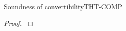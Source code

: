 \documentclass[acmlarge, anonymous, authordraft, review]{acmart} %
\begin{document}
\begin{lemma}{Soundness of convertibility}{THT-COMP}
  \begin{conds}
    \cond{$\Convertible\K\t\tp$}
    \cond{$\EnvTypeW\Env\K\e\t$}
    \cond{$\ep = \TRG{\e}\Env$}
    \cond{$\TR\K = \Kp$}
    \cond{$\TR\Env = \Envp$}
    \cond{$\EnvType\Envp\cdot\Kp{\ep}{\kty\t}$}
  \end{conds}
  \then\axiom{$\EnvType\Envp\cdot\Kp{\TAG\e\Env{\tp}}{\kty\tp}$}

  \begin{proof}{ \indmsg{$\Convertible\K\t\tp$}}
% 
% 
% 
% 
% 

  \end{proof}
\end{lemma}
\end{document}
